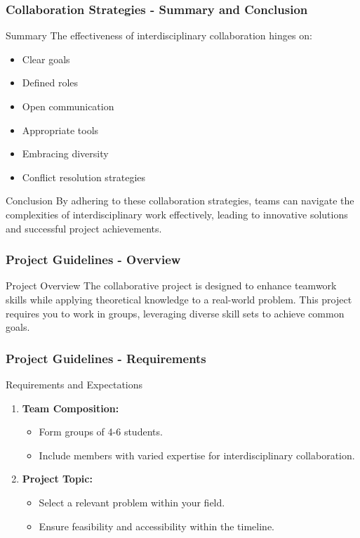 \documentclass[aspectratio=169]{beamer}
\begin{document}
\begin{frame}[fragile]
    \frametitle{Collaboration Strategies - Summary and Conclusion}
    \begin{block}{Summary}
        The effectiveness of interdisciplinary collaboration hinges on:
        \begin{itemize}
            \item Clear goals
            \item Defined roles
            \item Open communication
            \item Appropriate tools
            \item Embracing diversity
            \item Conflict resolution strategies
        \end{itemize}
    \end{block}
    \begin{block}{Conclusion}
        By adhering to these collaboration strategies, teams can navigate the complexities of interdisciplinary work effectively, leading to innovative solutions and successful project achievements.
    \end{block}
\end{frame}

\begin{frame}[fragile]
    \frametitle{Project Guidelines - Overview}
    \begin{block}{Project Overview}
        The collaborative project is designed to enhance teamwork skills while applying theoretical knowledge to a real-world problem.
        This project requires you to work in groups, leveraging diverse skill sets to achieve common goals.
    \end{block}
\end{frame}

\begin{frame}[fragile]
    \frametitle{Project Guidelines - Requirements}
    \begin{block}{Requirements and Expectations}
        \begin{enumerate}
            \item \textbf{Team Composition:}
                \begin{itemize}
                    \item Form groups of 4-6 students.
                    \item Include members with varied expertise for interdisciplinary collaboration.
                \end{itemize}
            \item \textbf{Project Topic:}
                \begin{itemize}
                    \item Select a relevant problem within your field.
                    \item Ensure feasibility and accessibility within the timeline.
                \end{itemize}
        \end{enumerate}
    \end{block}
\end{frame}
\end{document}

